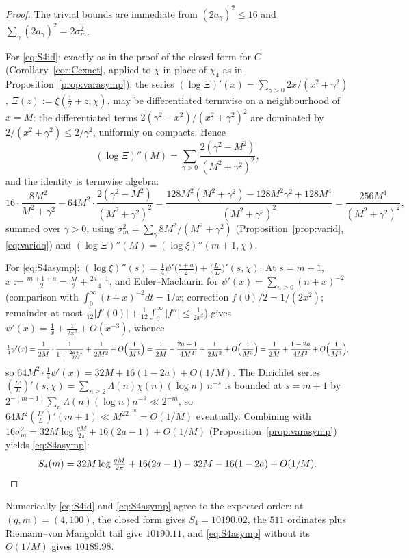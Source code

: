 \documentclass[11pt]{article}
\begin{document}
\begin{proof}
The trivial bounds are immediate from $(2a_\gamma)^2\le16$ and
$\sum_\gamma(2a_\gamma)^2=2\sigma_m^2$.

For \eqref{eq:S4id}: exactly as in the proof of the closed form for
$C$ (Corollary~\ref{cor:Cexact}, applied to $\chi$ in place of
$\chi_4$ as in Proposition~\ref{prop:varasymp}), the series
$(\log\Xi)'(x)=\sum_{\gamma>0}2x/(x^2+\gamma^2)$,
$\Xi(z):=\xi(\tfrac12+z,\chi)$, may be differentiated termwise on a
neighbourhood of $x=M$: the differentiated terms
$2(\gamma^2-x^2)/(x^2+\gamma^2)^2$ are dominated by
$2/(x^2+\gamma^2)\le2/\gamma^2$, uniformly on compacts. Hence
\[
(\log\Xi)''(M)=\sum_{\gamma>0}\frac{2(\gamma^2-M^2)}{(M^2+\gamma^2)^2},
\]
and the identity is termwise algebra:
\[
16\cdot\frac{8M^2}{M^2+\gamma^2}
-64M^2\cdot\frac{2(\gamma^2-M^2)}{(M^2+\gamma^2)^2}
=\frac{128M^2(M^2+\gamma^2)-128M^2\gamma^2+128M^4}{(M^2+\gamma^2)^2}
=\frac{256M^4}{(M^2+\gamma^2)^2},
\]
summed over $\gamma>0$, using
$\sigma_m^2=\sum_\gamma8M^2/(M^2+\gamma^2)$
(Proposition~\ref{prop:varid}, \eqref{eq:varidq}) and
$(\log\Xi)''(M)=(\log\xi)''(m+1,\chi)$.

For \eqref{eq:S4asymp}: $(\log\xi)''(s)=\tfrac14\psi'\bigl(\tfrac{s+a}2
\bigr)+\bigl(\tfrac{L'}{L}\bigr)'(s,\chi)$. At $s=m+1$,
$x:=\tfrac{m+1+a}2=\tfrac M2+\tfrac{2a+1}4$, and Euler--Maclaurin for
$\psi'(x)=\sum_{n\ge0}(n+x)^{-2}$ (comparison with
$\int_0^\infty(t+x)^{-2}dt=1/x$; correction $f(0)/2=1/(2x^2)$;
remainder at most
$\tfrac1{12}|f'(0)|+\tfrac1{12}\int_0^\infty|f''|\le\tfrac1{2x^3}$)
gives $\psi'(x)=\tfrac1x+\tfrac1{2x^2}+O(x^{-3})$, whence
\[
\tfrac14\psi'(x)=\frac1{2M}\cdot\frac1{1+\frac{2a+1}{2M}}
+\frac1{2M^2}+O\Bigl(\frac1{M^3}\Bigr)
=\frac1{2M}-\frac{2a+1}{4M^2}+\frac1{2M^2}
+O\Bigl(\frac1{M^3}\Bigr)
=\frac1{2M}+\frac{1-2a}{4M^2}+O\Bigl(\frac1{M^3}\Bigr),
\]
so $64M^2\cdot\tfrac14\psi'(x)=32M+16(1-2a)+O(1/M)$. The Dirichlet
series $(\tfrac{L'}{L})'(s,\chi)=\sum_{n\ge2}\Lambda(n)\chi(n)(\log
n)\,n^{-s}$ is bounded at $s=m+1$ by
$2^{-(m-1)}\sum_n\Lambda(n)(\log n)n^{-2}\ll2^{-m}$, so
$64M^2(\tfrac{L'}{L})'(m+1)\ll M^22^{-m}=O(1/M)$ eventually. Combining
with $16\sigma_m^2=32M\log\tfrac{qM}{2\pi}+16(2a-1)+O(1/M)$
(Proposition~\ref{prop:varasymp}) yields \eqref{eq:S4asymp}:
\[
S_4(m)=32M\log\tfrac{qM}{2\pi}+16(2a-1)-32M-16(1-2a)+O(1/M).
\qedhere
\]
\end{proof}

Numerically \eqref{eq:S4id} and \eqref{eq:S4asymp} agree to the
expected order: at $(q,m)=(4,100)$, the closed form gives
$S_4=10190.02$, the $511$ ordinates plus Riemann--von Mangoldt tail
give $10190.11$, and \eqref{eq:S4asymp} without its $O(1/M)$ gives
$10189.98$.
\end{document}
